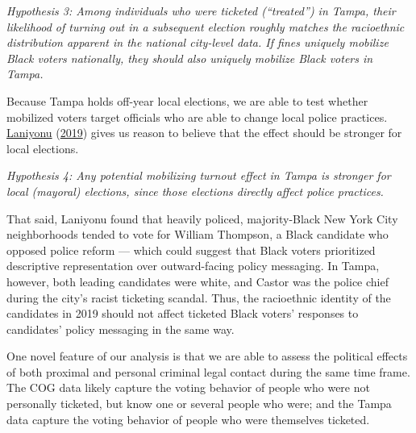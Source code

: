 \documentclass[
  12pt,
]{article}
\begin{document}
\emph{Hypothesis 3: Among individuals who were ticketed (``treated'') in Tampa, their likelihood of turning out in a subsequent election roughly matches the racioethnic distribution apparent in the national city-level data. If fines uniquely mobilize Black voters nationally, they should also uniquely mobilize Black voters in Tampa.}

Because Tampa holds off-year local elections, we are able to test whether mobilized voters target officials who are able to change local police practices. \protect\hyperlink{ref-Laniyonu2019}{Laniyonu} (\protect\hyperlink{ref-Laniyonu2019}{2019}) gives us reason to believe that the effect should be stronger for local elections.

\emph{Hypothesis 4: Any potential mobilizing turnout effect in Tampa is stronger for local (mayoral) elections, since those elections directly affect police practices.}

That said, Laniyonu found that heavily policed, majority-Black New York City neighborhoods tended to vote for William Thompson, a Black candidate who opposed police reform --- which could suggest that Black voters prioritized descriptive representation over outward-facing policy messaging. In Tampa, however, both leading candidates were white, and Castor was the police chief during the city's racist ticketing scandal. Thus, the racioethnic identity of the candidates in 2019 should not affect ticketed Black voters' responses to candidates' policy messaging in the same way.

One novel feature of our analysis is that we are able to assess the political effects of both proximal and personal criminal legal contact during the same time frame. The COG data likely capture the voting behavior of people who were not personally ticketed, but know one or several people who were; and the Tampa data capture the voting behavior of people who were themselves ticketed.
\end{document}
